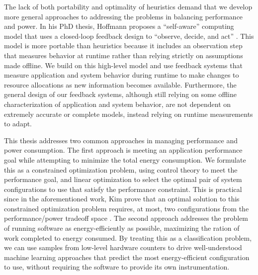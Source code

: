 The lack of both portability and optimality of heuristics demand that we develop more general approaches to addressing the problems in balancing performance and power.
In his PhD thesis, Hoffmann proposes a ``self-aware'' computing model that uses a closed-loop feedback design to ``observe, decide, and act'' .
This model is more portable than heuristics because it includes an observation step that measures behavior at runtime rather than relying strictly on assumptions made offline.
We build on this high-level model and use feedback systems that measure application and system behavior during runtime to make changes to resource allocations as new information becomes available.
Furthermore, the general design of our feedback systems, although still relying on some offline characterization of application and system behavior, are not dependent on extremely accurate or complete models, instead relying on runtime measurements to adapt.


This thesis addresses two common approaches in managing performance and power consumption.
The first approach is meeting an application performance goal while attempting to minimize the total energy consumption.
We formulate this as a constrained optimization problem, using control theory to meet the performance goal, and linear optimization to select the optimal pair of system configurations to use that satisfy the performance constraint.
This is practical since in the aforementioned work, Kim \etal prove that an optimal solution to this constrained optimization problem requires, at most, two configurations from the performance/power tradeoff space \cite{kim-cpsna2015}.
The second approach addresses the problem of running software as energy-efficiently as possible, \ie maximizing the ration of work completed to energy consumed.
By treating this as a classification problem, we can use samples from low-level hardware counters to drive well-understood machine learning approaches that predict the most energy-efficient configuration to use, without requiring the software to provide its own instrumentation.
